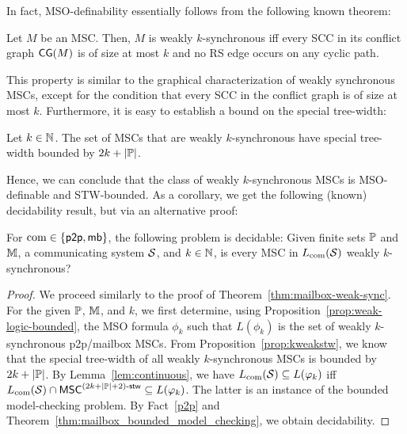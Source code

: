 \documentclass{article}
\begin{document}
In fact, MSO-definability essentially follows from the following known theorem:

\begin{theorem} \label{th:scccharactweak}
	Let $M$ be an MSC. Then, $M$ is weakly $k$-synchronous iff every SCC in its conflict graph
	$\mathsf{CG}(M)$ is of size at most $k$ and no RS edge occurs on any cyclic path.
\end{theorem}

This property is similar to the graphical characterization of weakly synchronous MSCs, except  for the condition that every SCC in the conflict graph is of size at most $k$.
Furthermore, it is easy to establish a bound on the special tree-width:

\begin{proposition}
\label{prop:kweakstw}
	Let $k \in \mathbb{N}$. The set of MSCs that are weakly $k$-synchronous have special tree-width bounded by $2k+|\mathbb{P}|$.
\end{proposition}

Hence, we can conclude that the class of weakly $k$-synchronous MSCs is MSO-definable and STW-bounded.
As a corollary, we get the following (known) decidability result, but via an alternative proof:

\begin{theorem}\label{thm:weak-sync}
For $\textup{com} \in \{\mathsf{p2p}, \mathsf{mb}\}$, the following problem is decidable:
Given finite sets $\mathbb{P}$ and $\mathbb{M}$, a communicating system $\mathcal{S}$, and $k \in \mathbb{N}$,
is every MSC in $L_{\textup{com}}(\mathcal{S})$ weakly $k$-synchronous?
\end{theorem}

\begin{proof}
We proceed similarly to the proof of Theorem~\ref{thm:mailbox-weak-sync}.
%
For the given $\mathbb{P}$, $\mathbb{M}$, and $k$, we first determine,
using Proposition~\ref{prop:weak-logic-bounded}, the MSO formula $\phi_k$ such that $L(\phi_k)$ is the set of weakly $k$-synchronous p2p/mailbox MSCs. From Proposition~\ref{prop:kweakstw}, we know that the special tree-width of all weakly $k$-synchronous MSCs is bounded by
$2k + |\mathbb{P}|$.
%
By Lemma~\ref{lem:continuous}, we have
$L_{\textup{com}}(\mathcal{S}) \subseteq L(\varphi_k)$ iff
$L_{\textup{com}}(\mathcal{S}) \cap \mathsf{MSC}^{(2k + |\mathbb{P}| + 2)\textup{-}\mathsf{stw}} \subseteq L(\varphi_k)$.
The latter is an instance of the bounded model-checking problem.
By Fact~\ref{p2p} and Theorem~\ref{thm:mailbox_bounded_model_checking}, we obtain decidability.
\end{proof}
\end{document}
